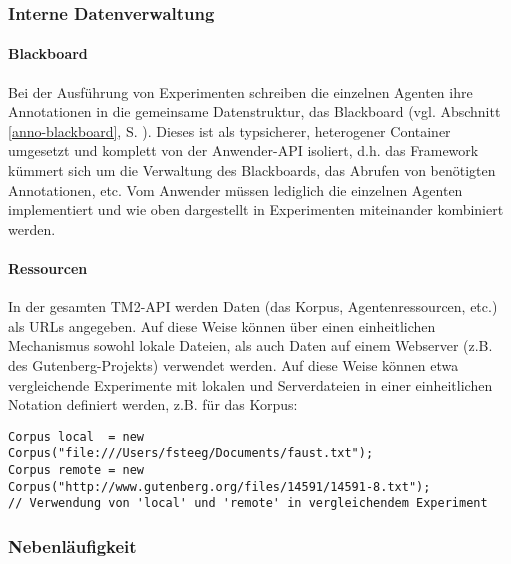 \documentclass[abstracton, 12pt]{scrartcl}
\begin{document}
\subsubsection{Interne Datenverwaltung} \label{impl-daten}

\paragraph{Blackboard} \label{impl-blackboard}

Bei der Ausführung von Experimenten schreiben die einzelnen Agenten ihre Annotationen in die gemeinsame Datenstruktur, das Blackboard (vgl. Abschnitt \ref{anno-blackboard}, S. \pageref{anno-blackboard}). Dieses ist als typsicherer, heterogener Container \citep[142]{Bloch2008} umgesetzt und komplett von der Anwender-API isoliert, d.h. das Framework kümmert sich um die Verwaltung des Blackboards, das Abrufen von benötigten Annotationen, etc. Vom Anwender müssen lediglich die einzelnen Agenten implementiert und wie oben dargestellt in Experimenten miteinander kombiniert werden.

\paragraph{Ressourcen}

In der gesamten TM2-API werden Daten (das Korpus, Agentenressourcen, etc.) als URLs angegeben. Auf diese Weise können über einen einheitlichen Mechanismus sowohl lokale Dateien, als auch Daten auf einem Webserver (z.B. des Gutenberg-Projekts) verwendet werden. Auf diese Weise können etwa vergleichende Experimente mit lokalen und Serverdateien in einer einheitlichen Notation definiert werden, z.B. für das Korpus:

\begin{lstlisting}
Corpus local  = new Corpus("file:///Users/fsteeg/Documents/faust.txt");
Corpus remote = new Corpus("http://www.gutenberg.org/files/14591/14591-8.txt");
// Verwendung von 'local' und 'remote' in vergleichendem Experiment
\end{lstlisting}

\subsubsection{Nebenläufigkeit} \label{impl-concurrency} 
\end{document}
